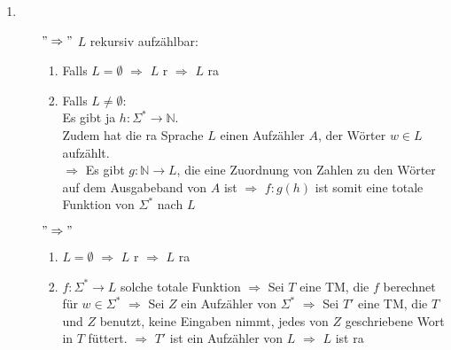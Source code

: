 \documentclass[a4paper,11pt]{scrartcl}
\begin{document}
\begin{enumerate}[label=\alph*)]
	\item	\begin{itemize}
			\item[$"\Rightarrow"$]
				$L$ rekursiv aufzählbar:
				\begin{enumerate}[label=\arabic*)]
				\item	Falls  $L = \emptyset$ $\Rightarrow$ $L$ r $\Rightarrow$ $L$ ra\\
				\item	Falls $L \neq \emptyset$:\\
						Es gibt ja $h: \Sigma^* \rightarrow \mathbb{N}$.\\
						Zudem hat die ra Sprache $L$ einen Aufzähler $A$, der Wörter $w \in L$ aufzählt.\\
						$\Rightarrow$ Es gibt $g: \mathbb{N} \rightarrow L$, die eine Zuordnung von Zahlen zu den Wörter auf dem Ausgabeband von $A$ ist
						$\Rightarrow$ $f:g(h)$ ist somit eine totale Funktion von $\Sigma^*$ nach $L$
				\end{enumerate}
			
			\item[$"\Rightarrow"$]
				\begin{enumerate}[label=\arabic*)]
				\item	$L=\emptyset$ $\Rightarrow$ $L$ r $\Rightarrow$ $L$ ra
				\item	$f: \Sigma^* \rightarrow L$ solche totale Funktion
						$\Rightarrow$ Sei $T$ eine TM, die $f$ berechnet für $w \in \Sigma^*$
						$\Rightarrow$ Sei $Z$ ein Aufzähler von $\Sigma^*$
						$\Rightarrow$ Sei $T'$ eine TM, die $T$ und $Z$ benutzt, keine Eingaben nimmt, jedes von $Z$ geschriebene Wort in $T$ füttert.
						$\Rightarrow$ $T'$ ist ein Aufzähler von $L$
						$\Rightarrow$ $L$ ist ra
				\end{enumerate}
			
			\end{itemize}
	\end{enumerate}
	
	
\end{document}

